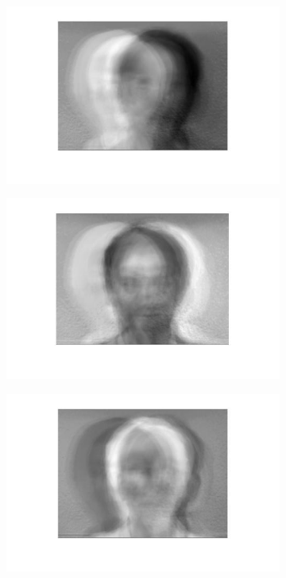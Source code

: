 \documentclass[a4paper]{iacas}
\begin{document}
\begin{figure}[!htbp]
	\centering
	\begin{subfigure}[b]{0.18\textwidth}
		\includegraphics[width=\textwidth]{201.jpg}
		\caption{}
		\label{fig:201}
	\end{subfigure}
	\begin{subfigure}[b]{0.18\textwidth}
		\includegraphics[width=\textwidth]{202.jpg}
		\caption{}
		\label{fig:202}
	\end{subfigure}
	\begin{subfigure}[b]{0.18\textwidth}
		\includegraphics[width=\textwidth]{203.jpg}

\end{subfigure}
\end{figure}
\end{document}
